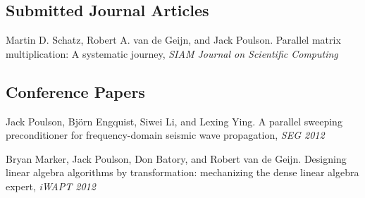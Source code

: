 \documentclass[letterpaper]{article}
\renewenvironment{itemize}{
  \begin{list}{}{
    \setlength{\leftmargin}{1.5em}
  }
}{
  \end{list}
}
\begin{document}
\subsection*{Submitted Journal Articles}

\begin{itemize}

\item Martin D. Schatz, Robert A. van de Geijn, and Jack Poulson.
Parallel matrix multiplication: A systematic journey, {\it SIAM Journal on Scientific Computing}



\end{itemize}

%
%
%
%
%

\subsection*{Conference Papers}

\begin{itemize}

\item Jack Poulson, Bj\"orn Engquist, Siwei Li, and Lexing Ying.
      A parallel sweeping preconditioner for frequency-domain seismic 
      wave propagation, {\it SEG 2012}

\item Bryan Marker, Jack Poulson, Don Batory, and Robert van de Geijn. 
      Designing linear algebra algorithms by transformation: mechanizing the 
      dense linear algebra expert, {\it iWAPT 2012}

\end{itemize}
\end{document}
